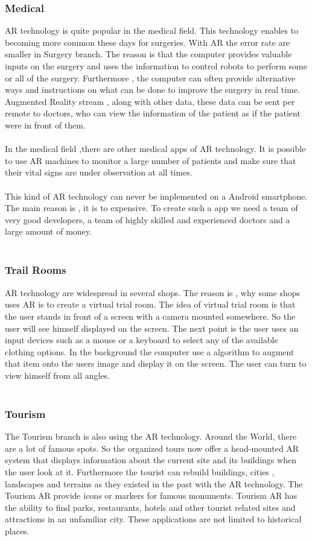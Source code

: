 \subsubsection{Medical}
AR technology is quite popular in the medical field.  This technology enables to becoming more common these days for surgeries.  With AR the error rate are smaller in Surgery branch. The reason is that the computer provides valuable inputs on the surgery and uses the information to control robots to perform some or all of the surgery.  Furthermore , the computer  can often provide alternative ways and instructions  on what can be done to improve the  surgery in real time.   Augmented Reality  stream , along with other data, these data can be sent per remote to doctors, who can view the information of the patient as  if the patient were in front of them.
\\
\\
In the medical field ,there are other medical apps of AR technology.  It is possible to use AR machines to monitor a large number of patients and make sure that their vital signs are under observation at all times.
\\
\\
This kind of AR technology can never be implemented on a Android smartphone. The main reason is , it is to expensive.  To create such a app we need a team of very good developers, a team of highly skilled and experienced doctors and a large amount of money.
\\
\\
\subsubsection{Trail Rooms}
AR technology are widespread in several shops. The reason is , why some shops uses AR is to create a virtual trial room.  The idea of virtual trial room is  that the user stands in front of a screen with a camera mounted somewhere.  So the user will see himself displayed on the screen. The next point is the user uses an input devices such as a mouse or a keyboard to select any of the available clothing options. In the background the computer use a algorithm to augment that item onto the users image and display it on the screen.  The  user can turn to view himself from all angles. 
\\
\\
\subsubsection{Tourism}
The Tourism branch is also using the AR technology.  Around the World, there are a lot of famous spots. So the organized tours now offer a head-mounted AR system that displays information about the current site and its buildings when the user look at it.  Furthermore the tourist can rebuild buildings, cities , landscapes and terrains as they existed in the past with the AR technology. The Tourism AR provide icons or markers for famous monuments. Tourism AR has the ability to find parks, restaurants, hotels and other tourist related sites and attractions in an unfamiliar city. These applications are not limited to historical places. 
\\
\\
